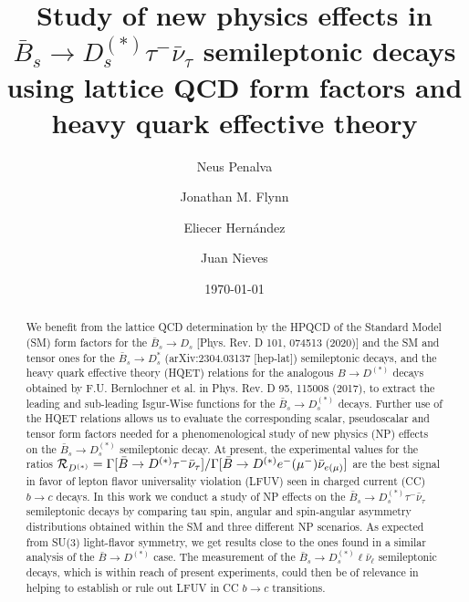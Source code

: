 \documentclass[aps,superscriptaddress,showpacs,nofootinbib,11pt]{revtex4-1}
\begin{document}
\title{\Large Study of new physics effects in $\bar B_s\to D^{(*)}_s\tau^-\bar\nu_\tau$ semileptonic decays 
using lattice QCD form factors and heavy quark effective theory}

\author{Neus Penalva}

\author{Jonathan M. Flynn}

\author{Eliecer Hern\'andez}
\author{ Juan Nieves}


\date{\today}
%
\begin{abstract}
We benefit from the lattice QCD determination by the HPQCD  of the Standard Model (SM) form 
factors for the  $\bar B_s\to D_s$ [Phys. Rev. D 101, 074513 (2020)] and the SM and tensor ones 
for the $\bar B_s\to D_s^{*}$ (arXiv:2304.03137 [hep-lat]) semileptonic decays, and the heavy quark effective theory (HQET) relations
 for the analogous $B\to D^{(*)}$ decays obtained by F.U. Bernlochner et al. in Phys. Rev. D 95, 115008 (2017),
  to extract the leading and sub-leading Isgur-Wise functions for the
$\bar B_s\to D_s^{(*)}$ decays. Further use of the HQET relations allows us to evaluate the corresponding scalar, pseudoscalar and tensor form factors needed for a phenomenological study of new physics (NP) effects on the $\bar B_s\to D_s^{(*)}$ semileptonic decay. 
At present, the experimental values for the ratios ${\cal R}_{D^{(*)}}=\Gamma[\bar B\to D^{(*)}\tau^-\bar\nu_\tau]/\Gamma[\bar B\to
D^{(*)}e^-(\mu^-)\bar\nu_{e(\mu)}]$ are the best signal in favor of lepton flavor universality violation (LFUV) seen in charged current (CC) $b\to c$ decays.  In this work
we conduct a study of NP effects on the $\bar B_s\to D_s^{(*)}\tau^-\bar\nu_\tau$ semileptonic decays by comparing  tau spin, angular and spin-angular asymmetry distributions obtained within the SM and three different NP scenarios. As expected from SU(3) light-flavor symmetry, we get  results close to the ones found in a similar analysis of the $\bar B\to D^{(*)}$ case. The measurement of the $\bar B_s\to D_s^{(*)}\ell\bar\nu_\ell$ semileptonic decays, which is within reach of present experiments,   could  then be of relevance in helping to establish or rule out LFUV in CC $b\to c$ transitions. 
\end{abstract} 
\end{document}
